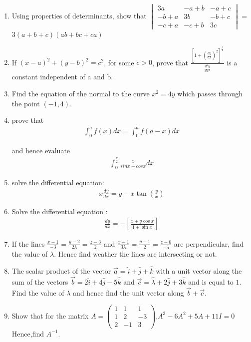 \documentclass[12pt,-letter paper]{article}
\providecommand{\sbrak}[1]{\ensuremath{{}\left[#1\right]}}
\providecommand{\brak}[1]{\ensuremath{\left(#1\right)}}
\theoremstyle{remark}
\newcommand{\myvec}[1]{\ensuremath{\begin{pmatrix}#1\end{pmatrix}}}
\newcommand{\mydet}[1]{\ensuremath{\begin{vmatrix}#1\end{vmatrix}}}
\begin{document}
\begin{enumerate}
\item Using properties of determinants, show that \mydet{3a & -a+b & -a+c \\ -b+a & 3b & -b+c \\ -c+a & -c+b & 3c} = 3\brak{a+b+c}\brak{ab+bc+ca}

\item If $\brak{x-a}^2+\brak{y-b}^2={c}^2$, for some $c>0$, prove that
$\frac{\sbrak{1+\brak{\frac{dy}{dx}}^2}^\frac{3}{2}}{\frac{d^2y}{dx^2}}$ is a constant independent of a and b.

\item Find the equation of the normal to the curve ${x}^2 = 4y$ which passes through the point $\brak{-1,4}$.

\item prove that \begin{align*}
    \int_{0}^{a} f\brak{x}dx = \int_{0}^{a} f\brak{a-x}dx
\end{align*}

and hence evaluate \begin{align*}\int_{0}^{\frac{\pi}{2}}\frac{x}{{sinx}+{cosx}}dx\end{align*}

\item solve the differential equation: \begin{align*}{x}\frac{dy}{dx}= {y}-{x}\tan\brak{\frac{y}{x}}\end{align*}

\item Solve the differential equation : \begin{align*}\frac{dy}{dx}= -\sbrak{\frac{x+y\cos x}{1+\sin x}}\end{align*}

\item If the lines $\frac{x-1}{-3}=\frac{y-2}{2\lambda}=\frac{z-3}{2}$ and $\frac{x-1}{3\lambda}=\frac{y-1}{2}=\frac{z-6}{-5}$ are perpendicular, find the value of $\lambda$. Hence find weather the lines are intersecting or not.

\item The scalar product of the vector $\overrightarrow{a} = \hat{i}+\hat{j}+\hat{k}$ with a unit vector along the sum of the vectors $\overrightarrow{b} = 2\hat{i}+4\hat{j}-5\hat{k}$ and $\overrightarrow{c} = \hat{\lambda}+2\hat{j}+3\hat{k}$ and is equal to $1$. Find the value of $\lambda$ and hence find the unit vector along $\overrightarrow{b}+\overrightarrow{c}$.

\item Show that for the matrix ${A}=\myvec{1&1&1 \\ 1&2&-3 \\ 2&-1&3}$,${A}^3-6{A}^2+5{A}+11{I}=0$
Hence,find $A^{-1}$.


\end{enumerate}
\end{document}
